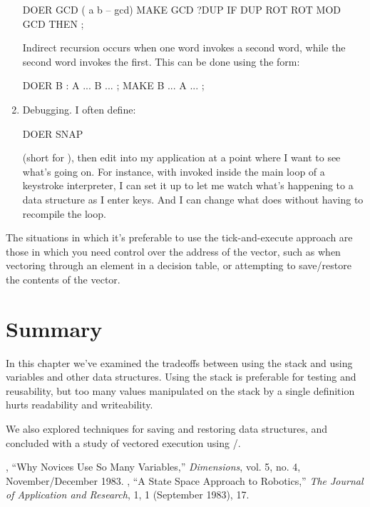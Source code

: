 \begin{enumerate}
\begin{Code}
DOER GCD ( a b -- gcd)
MAKE GCD  ?DUP  IF  DUP ROT ROT  MOD  GCD  THEN ;
\end{Code}
Indirect recursion occurs when one word invokes a second word, while the
second word invokes the first. This can be done using the form:

\begin{Code}
DOER B
: A  ... B ... ;
MAKE B  ... A ... ;
\end{Code}
\item Debugging. I often define:

\begin{Code}
DOER SNAP
\end{Code}
(short for ), then edit  into my
application at a point where I want to see what's going on. For
instance, with  invoked inside the main loop of a
keystroke interpreter, I can set it up to let me watch what's
happening to a data structure as I enter keys. And I can change what
 does without having to recompile the loop.
\end{enumerate}


The situations in which it's preferable to use the tick-and-execute approach
are those in which you need control over the address of the vector,
such as when vectoring through an element in a decision table, or
attempting to save/restore the contents of the vector.

\section{Summary}
In this chapter we've examined the tradeoffs between using the stack
and using variables and other data structures. Using the stack is
preferable for testing and reusability, but too many values manipulated
on the stack by a single definition hurts readability and writeability.

We also explored techniques for saving and restoring data structures,
and concluded with a study of vectored execution using
/.%

\begin{references}{9}
 , ``Why Novices Use So Many Variables,''
   \emph{\Forth{} Dimensions}, vol. 5, no. 4, November/December 1983.
 , ``A State Space Approach to
   Robotics,'' \emph{The Journal of \Forth{} Application and Research},
   1, 1 (September 1983), 17.
\end{references}

